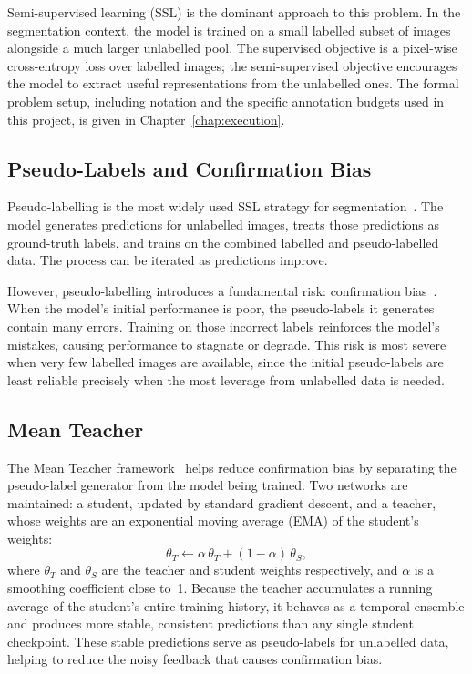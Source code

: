 Semi-supervised learning (SSL) is the dominant approach to this
problem. In the segmentation context, the model
is trained on a small labelled subset of images alongside a much larger
unlabelled pool. The supervised objective is a pixel-wise cross-entropy
loss over labelled images; the semi-supervised objective encourages the
model to extract useful representations from the unlabelled ones. The
formal problem setup, including notation and the specific annotation
budgets used in this project, is given in Chapter~\ref{chap:execution}.

\subsection{Pseudo-Labels and Confirmation Bias}

Pseudo-labelling is the most widely used SSL strategy for
segmentation~\cite{lee2013pseudo}. The model generates predictions
for unlabelled images, treats those predictions as ground-truth labels,
and trains on the combined labelled and pseudo-labelled data. The process
can be iterated as predictions improve.

However, pseudo-labelling introduces a fundamental risk: confirmation
bias~\cite{arazo2020pseudo}. When the model's initial performance is
poor, the pseudo-labels it generates contain many errors. Training on
those incorrect labels reinforces the model's mistakes, causing
performance to stagnate or degrade. This risk is most severe when very
few labelled images are available, since the initial pseudo-labels are
least reliable precisely when the most leverage from unlabelled data is
needed.

\subsection{Mean Teacher}

The Mean Teacher framework~\cite{tarvainen2017mean} helps reduce
confirmation bias by separating the pseudo-label generator from
the model being trained. Two networks are maintained: a student, updated
by standard gradient descent, and a teacher, whose weights are an
exponential moving average (EMA) of the student's weights:
\[
    \theta_T \leftarrow \alpha\,\theta_T + (1 - \alpha)\,\theta_S,
\]
where $\theta_T$ and $\theta_S$ are the teacher and student weights
respectively, and $\alpha$ is a smoothing coefficient close to~1.
Because the teacher accumulates a running
average of the student's entire training history, it behaves as a
temporal ensemble and produces more stable, consistent predictions than
any single student checkpoint. These stable predictions serve as pseudo-labels for unlabelled data,
helping to reduce the noisy feedback that causes confirmation bias.

